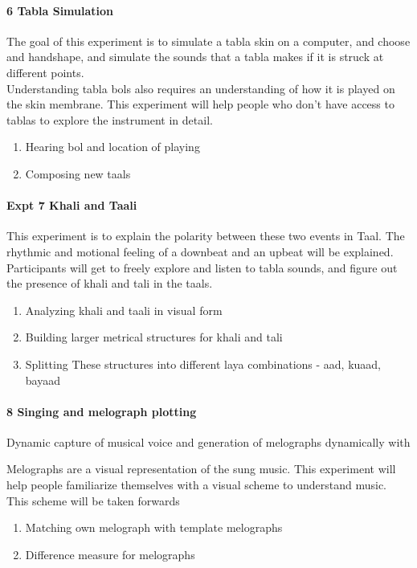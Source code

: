 \documentclass{tufte-handout}
\begin{document}
\paragraph{6 Tabla Simulation}
The goal of this experiment is to simulate a tabla skin on a computer,
and choose and handshape, and simulate the sounds that a tabla makes
if it is struck at different points.\\ 
Understanding tabla bols also requires an understanding of how it is
played on the skin membrane. This experiment will help people who
don't have access to tablas to explore the instrument in detail.

\begin{enumerate}
\item Hearing bol and location of playing
\item Composing new taals
\end{enumerate}
     
\paragraph{Expt 7 Khali and Taali}
This experiment is to explain the polarity between these two events in
Taal. The rhythmic and motional feeling of a downbeat and an upbeat
will be explained. Participants will get to freely explore and listen
to tabla sounds, and figure out the presence of khali and tali in the taals.
\begin{enumerate}
\item Analyzing khali and taali in visual form
\item Building larger metrical structures for khali and tali
\item Splitting These structures into different laya combinations - aad, kuaad, bayaad
\end{enumerate}
\paragraph{8 Singing and melograph plotting}

Dynamic capture of musical voice and generation of melographs dynamically with 

Melographs are a visual representation of the sung music. This
experiment will help people familiarize themselves with a visual
scheme to understand music. This scheme will be taken forwards

\begin{enumerate}
\item Matching own melograph with template melographs
\item Difference measure for melographs
\end{enumerate}
\end{document}
